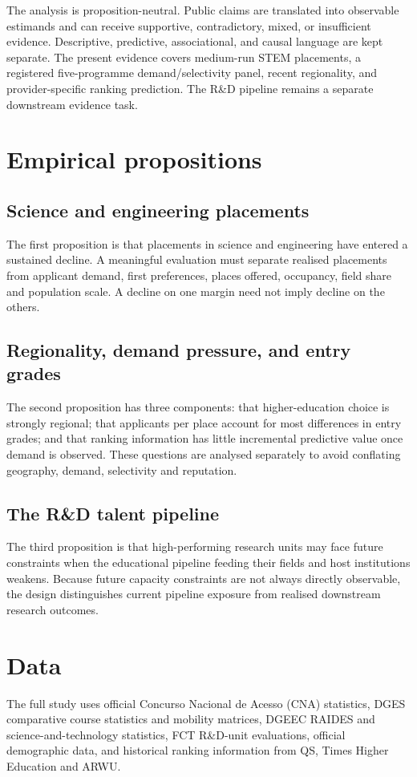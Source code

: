 \documentclass[11pt,a4paper]{article}
\begin{document}
The analysis is proposition-neutral. Public claims are translated into observable estimands and can receive supportive, contradictory, mixed, or insufficient evidence. Descriptive, predictive, associational, and causal language are kept separate. The present evidence covers medium-run STEM placements, a registered five-programme demand/selectivity panel, recent regionality, and provider-specific ranking prediction. The R\&D pipeline remains a separate downstream evidence task.

\section{Empirical propositions}
\subsection{Science and engineering placements}
The first proposition is that placements in science and engineering have entered a sustained decline. A meaningful evaluation must separate realised placements from applicant demand, first preferences, places offered, occupancy, field share and population scale. A decline on one margin need not imply decline on the others.

\subsection{Regionality, demand pressure, and entry grades}
The second proposition has three components: that higher-education choice is strongly regional; that applicants per place account for most differences in entry grades; and that ranking information has little incremental predictive value once demand is observed. These questions are analysed separately to avoid conflating geography, demand, selectivity and reputation.

\subsection{The R\&D talent pipeline}
The third proposition is that high-performing research units may face future constraints when the educational pipeline feeding their fields and host institutions weakens. Because future capacity constraints are not always directly observable, the design distinguishes current pipeline exposure from realised downstream research outcomes.

\section{Data}
The full study uses official Concurso Nacional de Acesso (CNA) statistics, DGES comparative course statistics and mobility matrices, DGEEC RAIDES and science-and-technology statistics, FCT R\&D-unit evaluations, official demographic data, and historical ranking information from QS, Times Higher Education and ARWU.
\end{document}
